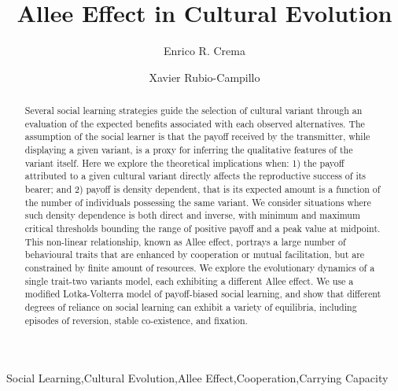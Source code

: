 \documentclass[review,authoryear]{elsarticle}
\begin{document}
\begin{frontmatter}

\title{Allee Effect in Cultural Evolution}


\author[label1,label2]{Enrico R. Crema}
\author[label3]{Xavier Rubio-Campillo}

\address[label1]{CaSEs - Complexity and Socio-Ecological Dynamics Research Group, Universitat Pompeu Fabra, Barcelona}
\address[label2]{UCL Institute of Archaeology}
\address[label3]{CASE - Computer Applications in Science and Engineering, Barcelona Supercomputing Center}



\begin{abstract}
Several social learning strategies guide the selection of cultural variant through an evaluation of the expected benefits associated with each observed alternatives. The assumption of the social learner is that the payoff received by the transmitter, while displaying a given variant, is a proxy for  inferring the qualitative features of the variant itself. Here we explore the theoretical implications when: 1) the payoff attributed to a given cultural variant directly affects the reproductive success of its bearer;  and 2) payoff is density dependent, that is its expected amount is a function of the number of individuals possessing the same variant. We consider situations where such density dependence is both direct and inverse, with minimum and maximum critical thresholds bounding the range of positive payoff and a peak value at midpoint. This non-linear relationship, known as Allee effect, portrays a large number of behavioural traits that are enhanced by cooperation or mutual facilitation, but are constrained by finite amount of resources.  We explore the evolutionary dynamics of a single trait-two variants model, each exhibiting a different Allee effect. We use a modified Lotka-Volterra model of payoff-biased social learning, and show that different degrees of reliance on social learning can exhibit a variety of equilibria, including episodes of reversion, stable co-existence, and fixation.

\end{abstract}

\begin{keyword}
Social Learning\sep Cultural Evolution\sep Allee Effect\sep Cooperation\sep Carrying Capacity
\end{keyword}

\end{frontmatter}
\end{document}
